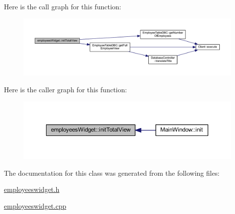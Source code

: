Here is the call graph for this function\+:
\nopagebreak
\begin{figure}[H]
\begin{center}
\leavevmode
\includegraphics[width=350pt]{classemployees_widget_aa3e84ab14c47870122877ed39f8aaeed_cgraph}
\end{center}
\end{figure}




Here is the caller graph for this function\+:
\nopagebreak
\begin{figure}[H]
\begin{center}
\leavevmode
\includegraphics[width=350pt]{classemployees_widget_aa3e84ab14c47870122877ed39f8aaeed_icgraph}
\end{center}
\end{figure}




The documentation for this class was generated from the following files\+:\begin{DoxyCompactItemize}
\item 
\hyperlink{employeeswidget_8h}{employeeswidget.\+h}\item 
\hyperlink{employeeswidget_8cpp}{employeeswidget.\+cpp}\end{DoxyCompactItemize}
